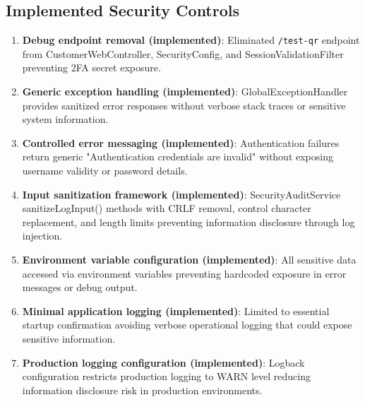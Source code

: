 \documentclass[]{UCD_CS_FYP_Report}
\begin{document}
\subsection{Implemented Security Controls}
\begin{enumerate}
	\item \textbf{Debug endpoint removal (implemented)}: Eliminated \texttt{/test-qr} endpoint from CustomerWebController, SecurityConfig, and SessionValidationFilter preventing 2FA secret exposure.
	\item \textbf{Generic exception handling (implemented)}: GlobalExceptionHandler provides sanitized error responses without verbose stack traces or sensitive system information.
	\item \textbf{Controlled error messaging (implemented)}: Authentication failures return generic "Authentication credentials are invalid" without exposing username validity or password details.
	\item \textbf{Input sanitization framework (implemented)}: SecurityAuditService sanitizeLogInput() methods with CRLF removal, control character replacement, and length limits preventing information disclosure through log injection.
	\item \textbf{Environment variable configuration (implemented)}: All sensitive data accessed via environment variables preventing hardcoded exposure in error messages or debug output.
	\item \textbf{Minimal application logging (implemented)}: Limited to essential startup confirmation avoiding verbose operational logging that could expose sensitive information.
	\item \textbf{Production logging configuration (implemented)}: Logback configuration restricts production logging to WARN level reducing information disclosure risk in production environments.
\end{enumerate}
\end{document}
